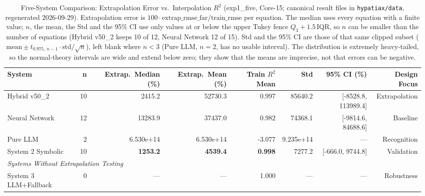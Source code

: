 \documentclass[twoside,11pt]{article}
\begin{document}
\begin{table}[t]
\centering
\caption{Five-System Comparison: Extrapolation Error vs.\ Interpolation $R^2$
  (exp1\_five, Core-15; canonical result files in \texttt{hypatiax/data}, regenerated 2026-09-29).
  Extrapolation error is $100\cdot\mathrm{extrap\_rmse\_far}/\mathrm{train\_rmse}$ per
  equation. The median uses every equation with a finite value; $n$, the mean, the Std and
  the 95\% CI use only values at or below the upper Tukey fence $Q_3+1.5\,\mathrm{IQR}$, so
  $n$ can be smaller than the number of equations (Hybrid v50\_2 keeps 10 of 12, Neural
  Network 12 of 15). Std and the 95\% CI are those of that same clipped subset
  ($\mathrm{mean} \pm t_{0.975,\,n-1} \cdot \mathrm{std}/\sqrt{n}$), left
  blank where $n<3$ (Pure LLM, $n=2$, has no usable interval). The distribution is extremely heavy-tailed, so the
  normal-theory intervals are wide and extend below zero; they show that the means
  are imprecise, not that errors can be negative.
}
\label{tab:five_systems_full}
\begin{tabular}{lrrrrrrr}
\toprule
\textbf{System} & \textbf{n}
  & \textbf{Extrap.\ Median (\%)} & \textbf{Extrap.\ Mean (\%)}
  & \textbf{Train $R^2$ Mean} & \textbf{Std} & \textbf{95\% CI (\%)}
  & \textbf{Design Focus} \\
\midrule
Hybrid v50\_2 & 10 & 2415.2 & 52730.3 & 0.997 & 85640.2 & [-8528.8, 113989.4] & Extrapolation \\
Neural Network & 12 & 13283.9 & 37437.0 & 0.982 & 74368.1 & [-9814.6, 84688.6] & Baseline \\
Pure LLM & 2 & 6.530e+14 & 6.530e+14 & -3.077 & 9.235e+14 & --- & Recognition \\
System 2 Symbolic & 10 & \textbf{1253.2} & \textbf{4539.4} & \textbf{0.998} & 7277.2 & [-666.0, 9744.8] & Validation \\
\midrule
\multicolumn{8}{l}{\textit{Systems Without Extrapolation Testing}} \\
System 3 LLM+Fallback & 0 & --- & --- & 1.000 & --- & --- & Robustness \\
\bottomrule
\end{tabular}
\end{table}
\end{document}
